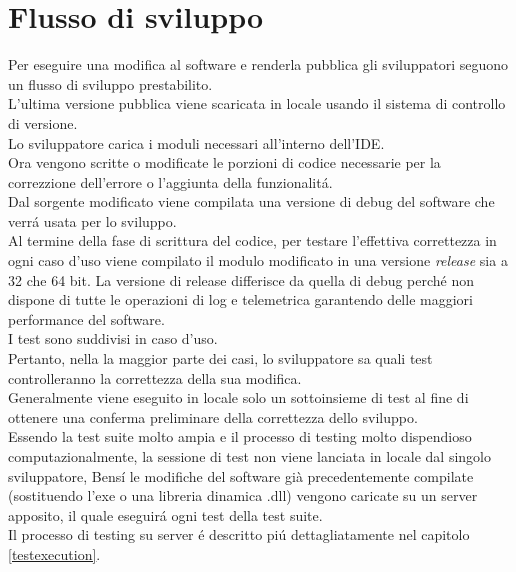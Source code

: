     \section{Flusso di sviluppo}
        Per eseguire una modifica al software e renderla pubblica gli sviluppatori seguono un flusso di sviluppo prestabilito.\\
        L'ultima versione pubblica viene scaricata in locale usando il sistema di controllo di versione.\\
        Lo sviluppatore carica i moduli necessari all'interno dell'IDE.\\
        Ora vengono scritte o modificate le porzioni di codice necessarie per la correzzione dell'errore o l'aggiunta della funzionalit\'a.\\
        Dal sorgente modificato viene compilata una versione di debug del software che verr\'a usata per lo sviluppo.\\
        Al termine della fase di scrittura del codice, per testare l'effettiva correttezza in ogni caso d'uso viene compilato il modulo modificato in una versione \textit{release} sia a 32 che 64 bit.
        La versione di release differisce da quella di debug perch\'e non dispone di tutte le operazioni di log e telemetrica garantendo delle maggiori performance del software.\\
        
        I test sono suddivisi in caso d'uso.\\
        Pertanto, nella la maggior parte dei casi, lo sviluppatore sa quali test  controlleranno la correttezza della sua modifica.\\
        Generalmente viene eseguito in locale solo un sottoinsieme di test al fine di ottenere una conferma preliminare della correttezza dello sviluppo.\\

        Essendo la test suite molto ampia e il processo di testing molto dispendioso computazionalmente, 
        la sessione di test non viene lanciata in locale dal singolo sviluppatore, 
        Bens\'i  le modifiche del software già precedentemente compilate (sostituendo l’exe o una libreria dinamica .dll) 
        vengono caricate su un server apposito, il quale eseguir\'a ogni test della test suite.\\

        Il processo di testing su server \'e descritto pi\'u dettagliatamente nel capitolo \ref{testexecution}.\\
        
